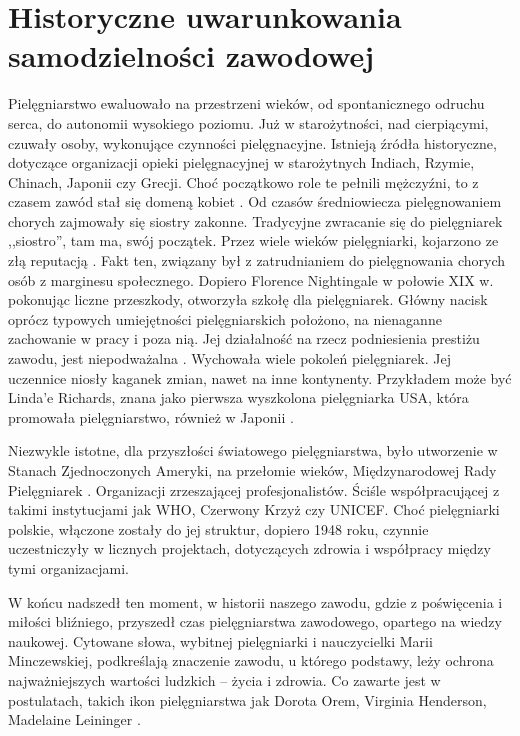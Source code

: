 \documentclass[a4paper,12pt,twoside,openany]{report}
\begin{document}
\section{Historyczne uwarunkowania samodzielności zawodowej}
Pielęgniarstwo ewaluowało na przestrzeni wieków, od spontanicznego odruchu serca, do autonomii wysokiego poziomu. Już w starożytności, nad cierpiącymi, czuwały osoby, wykonujące czynności pielęgnacyjne. Istnieją źródła historyczne, dotyczące organizacji opieki pielęgnacyjnej w starożytnych Indiach, Rzymie, Chinach, Japonii czy Grecji. Choć początkowo role te pełnili mężczyźni, to z czasem zawód stał się domeną kobiet \cite{zro}. Od czasów średniowiecza pielęgnowaniem chorych zajmowały się siostry zakonne. Tradycyjne zwracanie się do pielęgniarek ,,siostro”, tam ma, swój początek. Przez wiele wieków pielęgniarki, kojarzono ze złą reputacją \cite{tlo}. Fakt ten, związany był z zatrudnianiem do pielęgnowania chorych  osób z marginesu społecznego. Dopiero Florence Nightingale w połowie XIX w. pokonując liczne przeszkody, otworzyła szkołę dla pielęgniarek. Główny nacisk oprócz typowych umiejętności pielęgniarskich położono, na nienaganne zachowanie w pracy i poza nią. Jej działalność na rzecz podniesienia prestiżu zawodu, jest niepodważalna  \cite{flo}. Wychowała wiele pokoleń pielęgniarek. Jej uczennice niosły kaganek zmian, nawet na inne kontynenty. Przykładem może być Linda'e Richards, znana jako pierwsza wyszkolona pielęgniarka USA, która promowała pielęgniarstwo, również w Japonii \cite{linda}.

Niezwykle istotne, dla przyszłości światowego pielęgniarstwa, było utworzenie w Stanach Zjednoczonych Ameryki, na przełomie wieków, Międzynarodowej Rady Pielęgniarek \cite{rada}. Organizacji zrzeszającej profesjonalistów. Ściśle współpracującej z takimi instytucjami jak WHO, Czerwony Krzyż czy UNICEF. Choć pielęgniarki polskie, włączone zostały do jej struktur, dopiero 1948 roku, czynnie uczestniczyły w licznych projektach, dotyczących zdrowia i współpracy między tymi organizacjami.

W końcu nadszedł ten moment, w historii naszego zawodu, gdzie z poświęcenia i miłości bliźniego, przyszedł czas pielęgniarstwa zawodowego, opartego na wiedzy naukowej. Cytowane słowa, wybitnej pielęgniarki i nauczycielki Marii Minczewskiej, podkreślają znaczenie zawodu, u którego podstawy, leży  ochrona najważniejszych wartości ludzkich – życia i zdrowia.  Co zawarte jest w postulatach, takich ikon pielęgniarstwa jak Dorota Orem, Virginia Henderson, Madelaine Leininger \cite{ikon}.
\end{document}
